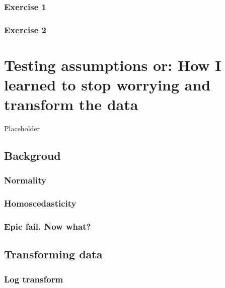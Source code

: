 \documentclass[english,10pt,a4paper,oneside]{book}
\begin{document}
\hypertarget{exercise-1-6}{%
\subsection{Exercise 1}\label{exercise-1-6}}

\hypertarget{exercise-2-2}{%
\subsection{Exercise 2}\label{exercise-2-2}}

\hypertarget{testing-assumptions-or-how-i-learned-to-stop-worrying-and-transform-the-data}{%
\chapter{Testing assumptions or: How I learned to stop worrying and transform the data}\label{testing-assumptions-or-how-i-learned-to-stop-worrying-and-transform-the-data}}

Placeholder

\hypertarget{backgroud}{%
\section{Backgroud}\label{backgroud}}

\hypertarget{normality-1}{%
\subsection{Normality}\label{normality-1}}

\hypertarget{homoscedasticity-1}{%
\subsection{Homoscedasticity}\label{homoscedasticity-1}}

\hypertarget{epic-fail.-now-what}{%
\subsection{Epic fail. Now what?}\label{epic-fail.-now-what}}

\hypertarget{transforming-data}{%
\section{Transforming data}\label{transforming-data}}

\hypertarget{log-transform}{%
\subsection{Log transform}\label{log-transform}}
\end{document}
